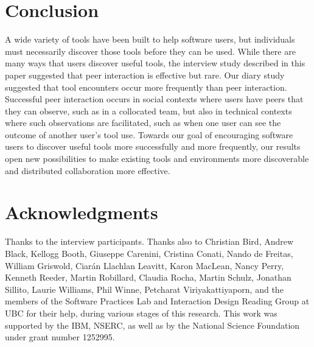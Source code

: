 \documentclass[smallextended]{svjour3}
\newcommand\discovery{peer interaction\xspace}
\newcommand\idrg[1]{\nb{IDRG}{#1}}
\begin{document}
\section{Conclusion}

\noindent
A wide variety of tools have been built to help software users, but individuals
must necessarily discover those tools before they can be used.
While there are many ways that users discover useful tools, 
the interview study described in this paper suggested that
\discovery is effective but rare. 
Our diary study suggested that tool encounters occur
more frequently than \discovery.
Successful \discovery occurs in social contexts where users have 
peers that they can observe, such as in a collocated team, 
but also in technical contexts where such observations are 
facilitated, such as when one user can see the outcome of another
user's tool use.
Towards our goal of encouraging software users to 
discover useful tools more successfully and more frequently,
our results open new possibilities to make existing tools and environments more
discoverable and distributed collaboration more effective.


\idrg{page numbers}

\section*{Acknowledgments}

\noindent
Thanks to the interview participants.
Thanks also to
Christian Bird,
Andrew Black,
Kellogg Booth,
Giuseppe Carenini,
Cristina Conati,
Nando de Freitas,
William Griswold,
Ciar\'an Llachlan Leavitt,
Karon MacLean,
Nancy Perry,
Kenneth Reeder,
Martin Robillard,
Claudia Rocha,
Martin Schulz,
Jonathan Sillito,
Laurie Williams,
Phil Winne,
Petcharat Viriyakattiyaporn,
and the members of the Software Practices Lab and
Interaction Design Reading Group at UBC
for their help, during various stages of this research.
This work was supported by the IBM, NSERC,
as well as 
by the National Science Foundation under grant number 1252995.



\end{document}
